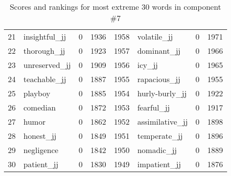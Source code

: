 \begin{table}[tbp]
\begin{tabular}{| rlr@{.}l | rlr@{.}l |}
    21 & insightful\_jj & 0 & 1936    &    1958 & volatile\_jj & 0 & 1971 \\
    22 & thorough\_jj & 0 & 1923    &    1957 & dominant\_jj & 0 & 1966 \\
    23 & unreserved\_jj & 0 & 1909    &    1956 & icy\_jj & 0 & 1965 \\
    24 & teachable\_jj & 0 & 1887    &    1955 & rapacious\_jj & 0 & 1955 \\
    25 & playboy & 0 & 1885    &    1954 & hurly-burly\_jj & 0 & 1922 \\
    26 & comedian & 0 & 1872    &    1953 & fearful\_jj & 0 & 1917 \\
    27 & humor & 0 & 1862    &    1952 & assimilative\_jj & 0 & 1898 \\
    28 & honest\_jj & 0 & 1849    &    1951 & temperate\_jj & 0 & 1896 \\
    29 & negligence & 0 & 1842    &    1950 & nomadic\_jj & 0 & 1889 \\
    30 & patient\_jj & 0 & 1830    &    1949 & impatient\_jj & 0 & 1876 \\
    \hline
    \end{tabular}
    \caption{Scores and rankings for most extreme 30 words in component \#7} 
\end{table}
\clearpage
